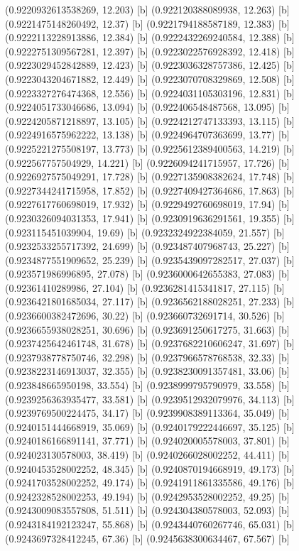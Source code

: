 {{{(0.9220932613538269, 12.203) [b] 
(0.922120388089938, 12.263) [b] 
(0.9221475148260492, 12.37) [b] 
(0.9221794188587189, 12.383) [b] 
(0.9222113228913886, 12.384) [b] 
(0.9222432269240584, 12.388) [b] 
(0.9222751309567281, 12.397) [b] 
(0.9223022576928392, 12.418) [b] 
(0.9223029452842889, 12.423) [b] 
(0.9223036328757386, 12.425) [b] 
(0.9223043204671882, 12.449) [b] 
(0.9223070708329869, 12.508) [b] 
(0.9223327276474368, 12.556) [b] 
(0.9224031105303196, 12.831) [b] 
(0.9224051733046686, 13.094) [b] 
(0.922406548487568, 13.095) [b] 
(0.9224205871218897, 13.105) [b] 
(0.9224212747133393, 13.115) [b] 
(0.9224916575962222, 13.138) [b] 
(0.9224964707363699, 13.77) [b] 
(0.9225221275508197, 13.773) [b] 
(0.9225612389400563, 14.219) [b] 
(0.922567757504929, 14.221) [b] 
(0.9226094241715957, 17.726) [b] 
(0.9226927575049291, 17.728) [b] 
(0.9227135908382624, 17.748) [b] 
(0.9227344241715958, 17.852) [b] 
(0.9227409427364686, 17.863) [b] 
(0.9227617760698019, 17.932) [b] 
(0.9229492760698019, 17.94) [b] 
(0.9230326094031353, 17.941) [b] 
(0.9230919636291561, 19.355) [b] 
(0.923115451039904, 19.69) [b] 
(0.9232324922384059, 21.557) [b] 
(0.9232533255717392, 24.699) [b] 
(0.923487407968743, 25.227) [b] 
(0.9234877551909652, 25.239) [b] 
(0.9235439097282517, 27.037) [b] 
(0.923571986996895, 27.078) [b] 
(0.9236000642655383, 27.083) [b] 
(0.92361410289986, 27.104) [b] 
(0.9236281415341817, 27.115) [b] 
(0.9236421801685034, 27.117) [b] 
(0.9236562188028251, 27.233) [b] 
(0.9236600382472696, 30.22) [b] 
(0.923660732691714, 30.526) [b] 
(0.9236655938028251, 30.696) [b] 
(0.923691250617275, 31.663) [b] 
(0.9237425642461748, 31.678) [b] 
(0.9237682210606247, 31.697) [b] 
(0.9237938778750746, 32.298) [b] 
(0.9237966578768538, 32.33) [b] 
(0.9238223146913037, 32.355) [b] 
(0.9238230091357481, 33.06) [b] 
(0.923848665950198, 33.554) [b] 
(0.9238999795790979, 33.558) [b] 
(0.9239256363935477, 33.581) [b] 
(0.9239512932079976, 34.113) [b] 
(0.9239769500224475, 34.17) [b] 
(0.9239908389113364, 35.049) [b] 
(0.9240151444668919, 35.069) [b] 
(0.9240179222446697, 35.125) [b] 
(0.9240186166891141, 37.771) [b] 
(0.924020005578003, 37.801) [b] 
(0.924023130578003, 38.419) [b] 
(0.9240266028002252, 44.411) [b] 
(0.9240453528002252, 48.345) [b] 
(0.9240870194668919, 49.173) [b] 
(0.9241703528002252, 49.174) [b] 
(0.9241911861335586, 49.176) [b] 
(0.9242328528002253, 49.194) [b] 
(0.9242953528002252, 49.25) [b] 
(0.9243009083557808, 51.511) [b] 
(0.924304380578003, 52.093) [b] 
(0.9243184192123247, 55.868) [b] 
(0.9243440760267746, 65.031) [b] 
(0.9243697328412245, 67.36) [b] 
(0.9245638300634467, 67.567) [b] 
}}}

